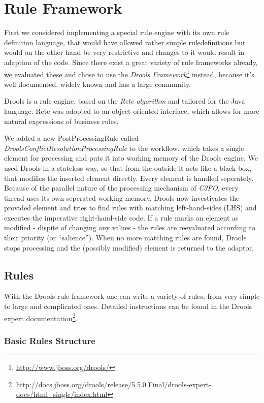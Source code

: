 \documentclass[a4paper,12pt]{article}
\begin{document}
\section{Rule Framework}

First we considered implementing a special rule engine with its own rule definition language, that would have allowed rather simple ruledefinitions but would on the other hand be very restrictive and changes to it would result in adaption of the code. Since there exist a great variety of rule frameworks already, we evaluated these and chose to use the \emph{Drools Framework}\footnote{\url{http://www.jboss.org/drools/}} instead, because it's well documented, widely known and has a large community.

Drools is a rule engine, based on the \emph{Rete algorithm} and tailored for the Java language. Rete was adopted to an object-oriented interface, which allows for more natural expressions of business rules.

We added a new PostProcessingRule called \emph{DroolsConflictResolutionProcessingRule} to the workflow, which takes a single element for processing and puts it into working memory of the Drools engine. We used Drools in a stateless way, so that from the outside it acts like a black box, that modifies the inserted element directly. Every element is handled seperately. Because of the parallel nature of the processing mechanism of \emph{C3PO}, every thread uses its own seperated working memory. Drools now investivates the provided element and tries to find rules with matching left-hand-sides (LHS) and executes the imperative right-hand-side code. If a rule marks an element as modified - dispite of changing any values - the rules are reevaluated according to their priority (or ``salience''). When no more matching rules are found, Drools stops processing and the (possibly modified) element is returned to the adaptor.

\subsection{Rules}

With the Drools rule framework one can write a variety of rules, from very simple to large and complicated ones. Detailed instructions can be found in the Drools expert documentation\footnote{\url{http://docs.jboss.org/drools/release/5.5.0.Final/drools-expert-docs/html_single/index.html}}.

\subsubsection{Basic Rules Structure}
\end{document}
